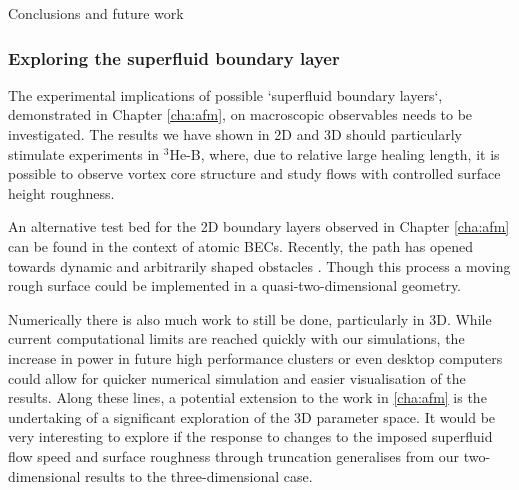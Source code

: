 \begin{chapter}{\label{cha:conc}Conclusions and future work}
\subsubsection{Exploring the superfluid boundary layer}
The experimental implications of possible `superfluid boundary layers`, demonstrated in Chapter \ref{cha:afm}, on macroscopic observables needs to be investigated.  The results we have shown in 2D and 3D should particularly stimulate experiments in $^3$He-B, where, due to relative
large healing length, it is possible to observe vortex core structure and study flows with controlled surface height roughness.

An alternative test bed for the 2D boundary layers observed in Chapter \ref{cha:afm} can be found in the context of atomic BECs. Recently, the path has opened towards dynamic and arbitrarily shaped obstacles \cite{Henderson09}. Though this process a moving rough surface could be implemented in a quasi-two-dimensional geometry.

Numerically there is also much work to still be done, particularly in 3D. While current computational limits are reached quickly with our simulations, the increase in power in future high performance clusters or even desktop computers could allow for quicker numerical simulation and easier visualisation of the results. Along these lines, a potential extension to the work in \ref{cha:afm} is the undertaking of a significant exploration of the 3D parameter space. It would be very interesting to explore if the response to changes to the imposed superfluid flow speed and surface roughness through truncation generalises from our two-dimensional results to the three-dimensional case.
\end{chapter}